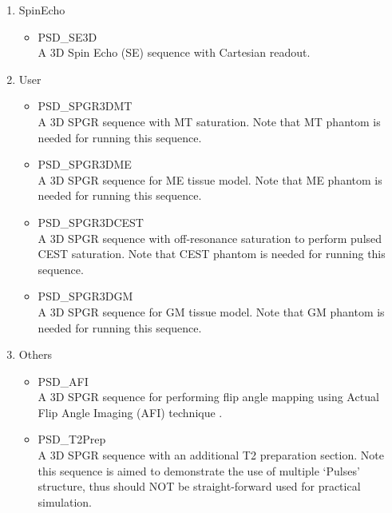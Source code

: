 \documentclass{book}%
\begin{document}
\begin{enumerate}
\item SpinEcho
\begin{itemize}
	\item PSD\_SE3D \\
	A 3D Spin Echo (SE) sequence with Cartesian readout.
\end{itemize}

\item User
\begin{itemize}
	\item PSD\_SPGR3DMT \\
	A 3D SPGR sequence with MT saturation. Note that MT phantom is needed for running this sequence.
	\item PSD\_SPGR3DME \\
	A 3D SPGR sequence for ME tissue model. Note that ME phantom is needed for running this sequence.
	\item PSD\_SPGR3DCEST \\
	A 3D SPGR sequence with off-resonance saturation to perform pulsed CEST saturation. Note that CEST phantom is needed for running this sequence.
	\item PSD\_SPGR3DGM \\
	A 3D SPGR sequence for GM tissue model. Note that GM phantom is needed for running this sequence.
\end{itemize}

\item Others
\begin{itemize}
	\item PSD\_AFI \\
	A 3D SPGR sequence for performing flip angle mapping using Actual Flip Angle Imaging (AFI) technique \cite{Yarnykh2007}.
	\item PSD\_T2Prep \\
	A 3D SPGR sequence with an additional T2 preparation section. Note this sequence is aimed to demonstrate the use of multiple `Pulses' structure, thus should NOT be straight-forward used for practical simulation.
\end{itemize}

\end{enumerate}
\end{document}
